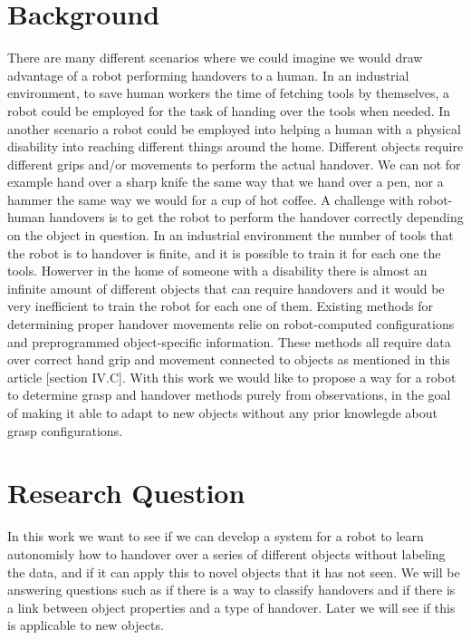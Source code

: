 \section{Background}

There are many different scenarios where we could imagine we would draw advantage of a robot performing handovers to a human. In an industrial environment, to save human workers the time of fetching tools by themselves, a robot could be employed for the task of handing over the tools when needed. In another scenario a robot could be employed into helping a human with a physical disability into reaching different things around the home. Different objects require different grips and/or movements to perform the actual handover. We can not for example hand over a sharp knife the same way that we hand over a pen, nor a hammer the same way we would for a cup of hot coffee. A challenge with robot-human handovers is to get the robot to perform the handover correctly depending on the object in question. In an industrial environment the number of tools that the robot is to handover is finite, and it is possible to train it for each one the tools. Howerver in the home of someone with a disability there is almost an infinite amount of different objects that can require handovers and it would be very inefficient to train the robot for each one of them. Existing methods for determining proper handover movements relie on robot-computed configurations and preprogrammed object-specific information. These methods all require data over correct hand grip and movement connected to objects as mentioned in this article [section IV.C]. With this work we would like to propose a way for a robot to determine grasp and handover methods purely from observations, in the goal of making it able to adapt to new objects without any prior knowlegde about grasp configurations.

\section{Research Question}

In this work we want to see if we can develop a system for a robot to learn autonomisly how to handover over a series of different objects without labeling the data, and if it can apply this to novel objects that it has not seen. We will be answering questions such as if there is a way to classify handovers and if there is a link between object properties and a type of handover. Later we will see if this is applicable to new objects.
